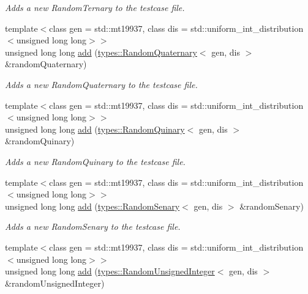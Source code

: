 \begin{DoxyCompactItemize}
\begin{DoxyCompactList}\small\item\em Adds a new Random\+Ternary to the testcase file. \end{DoxyCompactList}\item 
{\footnotesize template$<$class gen  = std\+::mt19937, class dis  = std\+::uniform\+\_\+int\+\_\+distribution$<$unsigned long long$>$$>$ }\\unsigned long long \hyperlink{classtestcaser_1_1maker_1_1TestCaseBuilder_adcb4d6cfafbf67234818b0b68c586ad4}{add} (\hyperlink{structtestcaser_1_1maker_1_1types_1_1RandomQuaternary}{types\+::\+Random\+Quaternary}$<$ gen, dis $>$ \&random\+Quaternary)
\begin{DoxyCompactList}\small\item\em Adds a new Random\+Quaternary to the testcase file. \end{DoxyCompactList}\item 
{\footnotesize template$<$class gen  = std\+::mt19937, class dis  = std\+::uniform\+\_\+int\+\_\+distribution$<$unsigned long long$>$$>$ }\\unsigned long long \hyperlink{classtestcaser_1_1maker_1_1TestCaseBuilder_a8c036fe574ac265ebbe37225727047e6}{add} (\hyperlink{structtestcaser_1_1maker_1_1types_1_1RandomQuinary}{types\+::\+Random\+Quinary}$<$ gen, dis $>$ \&random\+Quinary)
\begin{DoxyCompactList}\small\item\em Adds a new Random\+Quinary to the testcase file. \end{DoxyCompactList}\item 
{\footnotesize template$<$class gen  = std\+::mt19937, class dis  = std\+::uniform\+\_\+int\+\_\+distribution$<$unsigned long long$>$$>$ }\\unsigned long long \hyperlink{classtestcaser_1_1maker_1_1TestCaseBuilder_a60ef1510e12a3cc6018c7b198a2165e5}{add} (\hyperlink{structtestcaser_1_1maker_1_1types_1_1RandomSenary}{types\+::\+Random\+Senary}$<$ gen, dis $>$ \&random\+Senary)
\begin{DoxyCompactList}\small\item\em Adds a new Random\+Senary to the testcase file. \end{DoxyCompactList}\item 
{\footnotesize template$<$class gen  = std\+::mt19937, class dis  = std\+::uniform\+\_\+int\+\_\+distribution$<$unsigned long long$>$$>$ }\\unsigned long long \hyperlink{classtestcaser_1_1maker_1_1TestCaseBuilder_a31403b4d313d7e3933252bcd89e4a060}{add} (\hyperlink{classtestcaser_1_1maker_1_1types_1_1RandomUnsignedInteger}{types\+::\+Random\+Unsigned\+Integer}$<$ gen, dis $>$ \&random\+Unsigned\+Integer)

\end{DoxyCompactItemize}
